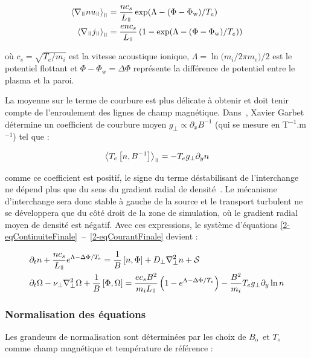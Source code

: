 \begin{refsection}
\begin{align}
\left<\nabla_\para
nu_\para\right>_\para&=\frac{nc_s}{L_\para}\exp(\Lambda-(\Phi-\Phi_\text{w})/T_e)
\\
\left<\nabla_\para
j_\para\right>_\para&=\frac{enc_s}{L_\para}\left(1-\exp(\Lambda-(\Phi-\Phi_\text{w})/T_e)\right)
\end{align}

où $c_s=\sqrt{T_e/m_i}$ est la vitesse acoustique
ionique, $\Lambda=\ln({m_{i}/2\pi m_{e})/2}$ est le
potentiel flottant et $\Phi-\Phi_\text{w}=\Delta \Phi$ représente la
différence de potentiel entre le plasma et la paroi. 

La moyenne sur le terme de courbure est plus délicate à obtenir et doit tenir
compte de l'enroulement des lignes de champ magnétique.
Dans~\parencite{Garbet}, Xavier Garbet détermine un coefficient de courbure
moyen $g_\perp\propto\partial_xB^{-1}$ (qui se mesure en T$^{-1}$.m$^{-1}$) tel
que :

\begin{equation}
\left<T_e\left[n,B^{-1}\right]\right>_\para=-T_eg_\perp\partial_yn
\end{equation}

comme ce coefficient est positif, le signe du terme déstabilisant
de l'interchange ne dépend plus que du sens du gradient
radial de densité~\parencite{SarazinPhD}. Le mécanisme d'interchange sera donc
stable à gauche de la source et le transport turbulent ne se développera que du côté droit de la zone
de simulation, où le gradient radial moyen de densité est négatif.
Avec ces expressions, le système d'équations \eqref{2-eqContinuiteFinale}~--~\eqref{2-eqCourantFinale} devient :

\begin{align}
\label{2-eqContinuiteMoyenne}
&\partial_t n + \frac{nc_s}{L_\para}e^{\Lambda-\Delta \Phi/T_e} =
\frac{1}{B}\left[n,\Phi\right] + D_\perp\nabla^2_\perp n + \mathcal{S}\\
&\partial_{t}\Omega - \nu_\perp
\nabla_\perp^2\Omega+
\frac{1}{B}\left[\Phi,\Omega\right]=\frac{ec_sB^2}{m_iL_\para}\left(1-e^{\Lambda-\Delta
\Phi/T_e}\right) -\frac{B^2}{m_i}T_eg_\perp\partial_y\ln n
\label{2-eqCourantMoyenne}
\end{align}
 
\subsubsection{Normalisation des équations}

Les grandeurs de normalisation sont déterminées par les choix de
$B_{{_{0}}}$ et $T_{{_{0}}}$ comme champ magnétique et température de
référence :


\end{refsection}
